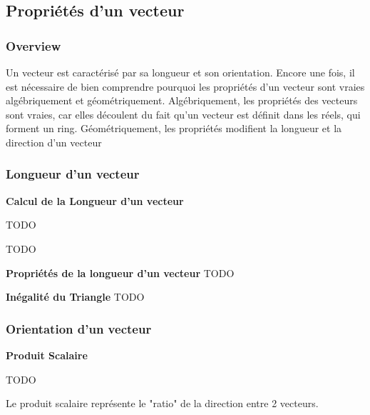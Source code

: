 \documentclass{article}
\begin{document}
\subsection{Propriétés d'un vecteur}%
\label{ssub:Quelles sont les propriétés d'un vecteur}

\subsubsection{Overview}%
\label{ssub:Overview}

Un vecteur est caractérisé par sa longueur et son orientation. Encore une fois,
il est nécessaire de bien comprendre pourquoi les propriétés d'un vecteur sont
vraies algébriquement et géométriquement. Algébriquement, les propriétés des
vecteurs sont vraies, car elles découlent du fait qu'un vecteur est définit
dans les réels, qui forment un ring. Géométriquement, les propriétés modifient
la longueur et la direction d'un vecteur

\subsubsection{Longueur d'un vecteur}%
\label{ssub:Longueur d'un vecteur}

\textbf{Calcul de la Longueur d'un vecteur}

\begin{definition}
    TODO
\end{definition}

\begin{definition}
    TODO
\end{definition}

\textbf{Propriétés de la longueur d'un vecteur}
TODO

\textbf{Inégalité du Triangle}
TODO

\subsubsection{Orientation d'un vecteur}%
\label{ssub:Orientation d'un vecteur}

\textbf{Produit Scalaire}

\begin{definition}
    TODO
\end{definition}

\begin{intuition}
    Le produit scalaire représente le "ratio" de la direction entre 2 vecteurs.
\end{intuition}
\end{document}

